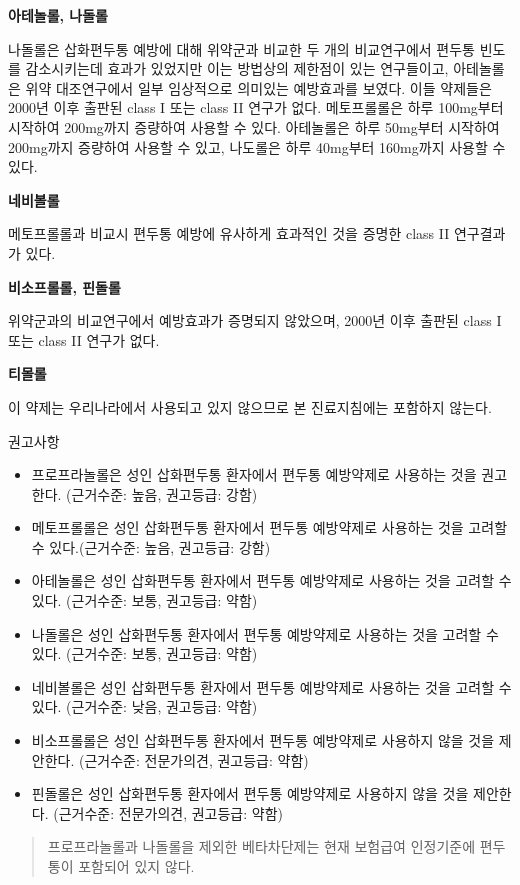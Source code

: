 \documentclass[]{book}
\begin{document}
\textbf{아테놀롤, 나돌롤}

나돌롤은 삽화편두통 예방에 대해 위약군과 비교한 두 개의 비교연구에서 편두통 빈도를 감소시키는데 효과가 있었지만 이는 방법상의 제한점이 있는 연구들이고, 아테놀롤은 위약 대조연구에서 일부 임상적으로 의미있는 예방효과를 보였다. 이들 약제들은 2000년 이후 출판된 class I 또는 class II 연구가 없다. 메토프롤롤은 하루 100mg부터 시작하여 200mg까지 증량하여 사용할 수 있다. 아테놀롤은 하루 50mg부터 시작하여 200mg까지 증량하여 사용할 수 있고, 나도롤은 하루 40mg부터 160mg까지 사용할 수 있다.

\textbf{네비볼롤}

메토프롤롤과 비교시 편두통 예방에 유사하게 효과적인 것을 증명한 class II 연구결과가 있다.

\textbf{비소프롤롤, 핀돌롤}

위약군과의 비교연구에서 예방효과가 증명되지 않았으며, 2000년 이후 출판된 class I 또는 class II 연구가 없다.

\textbf{티몰롤}

이 약제는 우리나라에서 사용되고 있지 않으므로 본 진료지침에는 포함하지 않는다.

권고사항

\begin{itemize}
\item
  프로프라놀롤은 성인 삽화편두통 환자에서 편두통 예방약제로 사용하는 것을 권고한다. (근거수준: 높음, 권고등급: 강함)
\item
  메토프롤롤은 성인 삽화편두통 환자에서 편두통 예방약제로 사용하는 것을 고려할 수 있다.(근거수준: 높음, 권고등급: 강함)
\item
  아테놀롤은 성인 삽화편두통 환자에서 편두통 예방약제로 사용하는 것을 고려할 수 있다. (근거수준: 보통, 권고등급: 약함)
\item
  나돌롤은 성인 삽화편두통 환자에서 편두통 예방약제로 사용하는 것을 고려할 수 있다. (근거수준: 보통, 권고등급: 약함)
\item
  네비볼롤은 성인 삽화편두통 환자에서 편두통 예방약제로 사용하는 것을 고려할 수 있다. (근거수준: 낮음, 권고등급: 약함)
\item
  비소프롤롤은 성인 삽화편두통 환자에서 편두통 예방약제로 사용하지 않을 것을 제안한다. (근거수준: 전문가의견, 권고등급: 약함)
\item
  핀돌롤은 성인 삽화편두통 환자에서 편두통 예방약제로 사용하지 않을 것을 제안한다. (근거수준: 전문가의견, 권고등급: 약함)
\end{itemize}

\begin{quote}
프로프라놀롤과 나돌롤을 제외한 베타차단제는 현재 보험급여 인정기준에 편두통이 포함되어 있지 않다.
\end{quote}
\end{document}
